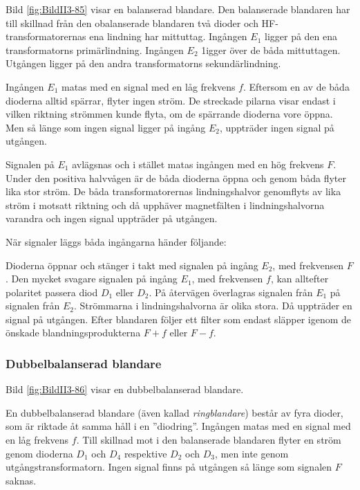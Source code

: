 
Bild \ref{fig:BildII3-85} visar en balanserad blandare.
Den balanserade blandaren har till skillnad från den obalanserade blandaren två
dioder och HF-transformatorernas ena lindning har mittuttag.
Ingången \(E_1\) ligger på den ena transformatorns primärlindning.
Ingången \(E_2\) 1igger över de båda mittuttagen.
Utgången ligger på den andra transformatorns sekundärlindning.

Ingången \(E_1\) matas med en signal med en låg frekvens \(f\).
Eftersom en av de båda dioderna alltid spärrar, flyter ingen ström.
De streckade pilarna visar endast i vilken riktning strömmen kunde flyta, om de
spärrande dioderna vore öppna.
Men så länge som ingen signal ligger på ingång \(E_2\), uppträder ingen
signal på utgången.

Signalen på \(E_1\) avlägsnas och i stället matas ingången med en hög
frekvens \(F\).
Under den positiva halvvågen är de båda dioderna öppna och genom båda flyter
lika stor ström.
De båda transformatorernas lindningshalvor genomflyts av lika ström i motsatt
riktning och då upphäver magnetfälten i lindningshalvorna varandra och ingen
signal uppträder på utgången.

När signaler läggs båda ingångarna händer följande:

Dioderna öppnar och stänger i takt med signalen på ingång \(E_2\), med
frekvensen \(F\).
Den mycket svagare signalen på ingång \(E_1\), med frekvensen \(f\), kan
alltefter polaritet passera diod \(D_1\) eller \(D_2\).
På återvägen överlagras signalen från \(E_1\) på signalen från \(E_2\).
Strömmarna i lindningshalvorna är olika stora.
Då uppträder en signal på utgången.
Efter blandaren följer ett filter som endast släpper igenom de önskade
blandningsprodukterna \(F + f\) eller \(F - f\).

\subsubsection{Dubbelbalanserad blandare}


Bild \ref{fig:BildII3-86} visar en dubbelbalanserad blandare.

En dubbelbalanserad blandare (även kallad \emph{ringblandare}) består av fyra
dioder, som är riktade åt samma håll i en ''diodring''.
Ingången matas med en signal med en låg frekvens \(f\).
Till skillnad mot i den balanserade blandaren flyter en ström genom dioderna
\(D_1\) och \(D_4\) respektive \(D_2\) och \(D_3\), men inte genom
utgångstransformatorn.
Ingen signal finns på utgången så länge som signalen \(F\) saknas.

